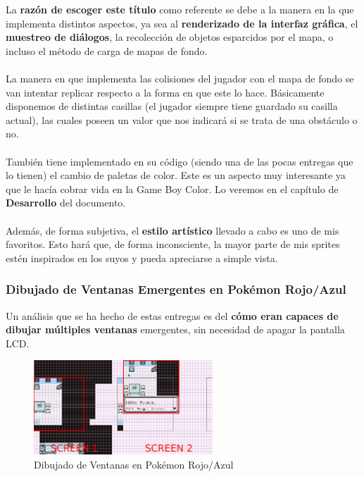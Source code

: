 La \textbf{razón de escoger este título} como referente se debe a la manera en la que implementa distintos aspectos, ya sea al \textbf{renderizado de la interfaz gráfica}, el \textbf{muestreo de diálogos}, la recolección de objetos esparcidos por el mapa, o incluso el método de carga de mapas de fondo.
\\ \\
La manera en que implementa las colisiones del jugador con el mapa de fondo se van intentar replicar respecto a la forma en que este lo hace. Básicamente disponemos de distintas casillas (el jugador siempre tiene guardado su casilla actual), las cuales poseen un valor que nos indicará si se trata de una obstáculo o no.
\\ \\
También tiene implementado en su código (siendo una de las pocas entregas que lo tienen) el cambio de paletas de color. Este es un aspecto muy interesante ya que le hacía cobrar vida en la Game Boy Color. Lo veremos en el capítulo de \textbf{Desarrollo} del documento.
\\ \\
Además, de forma subjetiva, el \textbf{estilo artístico} llevado a cabo es uno de mis favoritos. Esto hará que, de forma inconsciente, la mayor parte de mis sprites estén inspirados en los suyos y pueda apreciarse a simple vista.

\subsubsection{Dibujado de Ventanas Emergentes en Pokémon Rojo/Azul}

Un análisis que se ha hecho de estas entregas es del \textbf{cómo eran capaces de dibujar múltiples ventanas} emergentes, sin necesidad de apagar la pantalla LCD.

\begin{figure}[h]
\centering
\includegraphics[width=0.6\textwidth]{include/images/desarrollo/screensdialog.png}
\caption{Dibujado de Ventanas en Pokémon Rojo/Azul}
\label{figure:drawtextspoke}
\end{figure}

